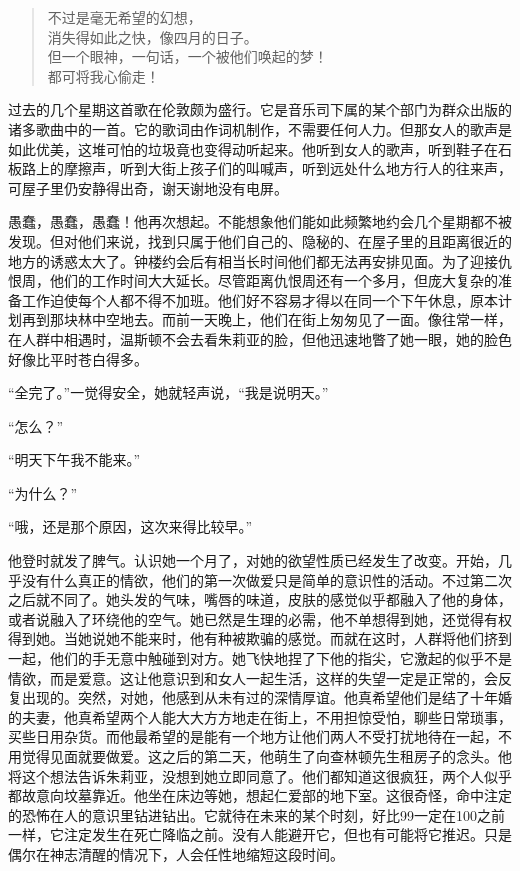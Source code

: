 \begin{quotation}
\noindent 不过是毫无希望的幻想，\\
消失得如此之快，像四月的日子。\\
但一个眼神，一句话，一个被他们唤起的梦！\\
都可将我心偷走！
\end{quotation}

过去的几个星期这首歌在伦敦颇为盛行。它是音乐司下属的某个部门为群众出版的诸多歌曲中的一首。它的歌词由作词机制作，不需要任何人力。但那女人的歌声是如此优美，这堆可怕的垃圾竟也变得动听起来。他听到女人的歌声，听到鞋子在石板路上的摩擦声，听到大街上孩子们的叫喊声，听到远处什么地方行人的往来声，可屋子里仍安静得出奇，谢天谢地没有电屏。

愚蠢，愚蠢，愚蠢！他再次想起。不能想象他们能如此频繁地约会几个星期都不被发现。但对他们来说，找到只属于他们自己的、隐秘的、在屋子里的且距离很近的地方的诱惑太大了。钟楼约会后有相当长时间他们都无法再安排见面。为了迎接仇恨周，他们的工作时间大大延长。尽管距离仇恨周还有一个多月，但庞大复杂的准备工作迫使每个人都不得不加班。他们好不容易才得以在同一个下午休息，原本计划再到那块林中空地去。而前一天晚上，他们在街上匆匆见了一面。像往常一样，在人群中相遇时，温斯顿不会去看朱莉亚的脸，但他迅速地瞥了她一眼，她的脸色好像比平时苍白得多。

``全完了。''一觉得安全，她就轻声说，``我是说明天。''

``怎么？''

``明天下午我不能来。''

``为什么？''

``哦，还是那个原因，这次来得比较早。''

他登时就发了脾气。认识她一个月了，对她的欲望性质已经发生了改变。开始，几乎没有什么真正的情欲，他们的第一次做爱只是简单的意识性的活动。不过第二次之后就不同了。她头发的气味，嘴唇的味道，皮肤的感觉似乎都融入了他的身体，或者说融入了环绕他的空气。她已然是生理的必需，他不单想得到她，还觉得有权得到她。当她说她不能来时，他有种被欺骗的感觉。而就在这时，人群将他们挤到一起，他们的手无意中触碰到对方。她飞快地捏了下他的指尖，它激起的似乎不是情欲，而是爱意。这让他意识到和女人一起生活，这样的失望一定是正常的，会反复出现的。突然，对她，他感到从未有过的深情厚谊。他真希望他们是结了十年婚的夫妻，他真希望两个人能大大方方地走在街上，不用担惊受怕，聊些日常琐事，买些日用杂货。而他最希望的是能有一个地方让他们两人不受打扰地待在一起，不用觉得见面就要做爱。这之后的第二天，他萌生了向查林顿先生租房子的念头。他将这个想法告诉朱莉亚，没想到她立即同意了。他们都知道这很疯狂，两个人似乎都故意向坟墓靠近。他坐在床边等她，想起仁爱部的地下室。这很奇怪，命中注定的恐怖在人的意识里钻进钻出。它就待在未来的某个时刻，好比99一定在100之前一样，它注定发生在死亡降临之前。没有人能避开它，但也有可能将它推迟。只是偶尔在神志清醒的情况下，人会任性地缩短这段时间。


